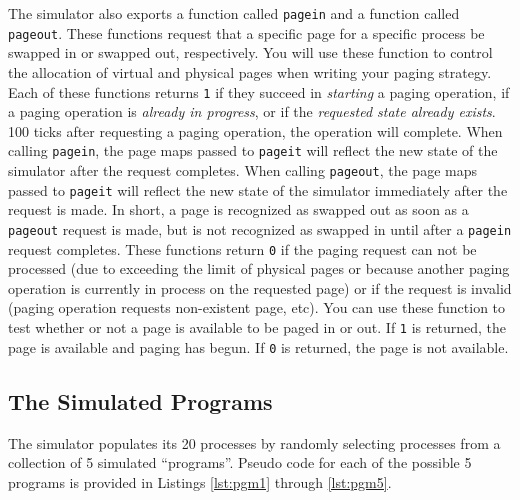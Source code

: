 \documentclass[12pt]{article}
\begin{document}
The simulator also exports a function called \texttt{pagein} and a
function called \texttt{pageout}. These functions request that a
specific page for a specific process be swapped in or swapped out,
respectively. You will use these function to control the allocation of
virtual and physical pages when writing your paging strategy. Each of
these functions returns \texttt{1} if they succeed in \emph{starting} a
paging operation, if a paging operation is \emph{already in
  progress}, or if the \emph{requested state already exists}.
100 ticks after requesting a paging operation, the
operation will complete. When calling \texttt{pagein}, the page maps passed
to \texttt{pageit}
will reflect the new state of the simulator after the request
completes. When calling \texttt{pageout}, the page maps passed
to \texttt{pageit}
will reflect the new state of the simulator immediately after the request
is made. In short, a page is recognized as swapped out as soon as a
\texttt{pageout} request is made, but is not recognized as swapped in
until after a \texttt{pagein} request completes.
These functions return
\texttt{0} if the paging request can not be processed (due to
exceeding the limit of physical pages or because another paging
operation is currently in process on the requested page) or if the
request is invalid (paging operation requests non-existent page,
etc). You can use these function to test whether or not a page is
available to be paged in or out.
If \texttt{1} is returned, the page is available
and paging has begun. If \texttt{0} is returned, the page is not
available.

\subsection {The Simulated Programs}

The simulator populates its 20 processes by randomly selecting processes
from a collection of 5 simulated ``programs''. Pseudo code for each of
the possible 5 programs is provided in Listings \ref{lst:pgm1} through
\ref{lst:pgm5}.








\end{document}
